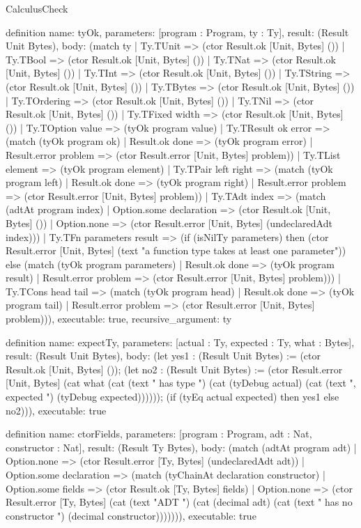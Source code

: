 \begin{lexlean}{CalculusCheck}
\begin{semanticmodule}
definition{
  name: tyOk,
  parameters: [program : Program, ty : Ty],
  result: (Result Unit Bytes),
  body: (match ty
    | Ty.TUnit => (ctor Result.ok [Unit, Bytes] ())
    | Ty.TBool => (ctor Result.ok [Unit, Bytes] ())
    | Ty.TNat => (ctor Result.ok [Unit, Bytes] ())
    | Ty.TInt => (ctor Result.ok [Unit, Bytes] ())
    | Ty.TString => (ctor Result.ok [Unit, Bytes] ())
    | Ty.TBytes => (ctor Result.ok [Unit, Bytes] ())
    | Ty.TOrdering => (ctor Result.ok [Unit, Bytes] ())
    | Ty.TNil => (ctor Result.ok [Unit, Bytes] ())
    | Ty.TFixed width => (ctor Result.ok [Unit, Bytes] ())
    | Ty.TOption value => (tyOk program value)
    | Ty.TResult ok error => (match (tyOk program ok)
      | Result.ok done => (tyOk program error)
      | Result.error problem => (ctor Result.error [Unit, Bytes] problem))
    | Ty.TList element => (tyOk program element)
    | Ty.TPair left right => (match (tyOk program left)
      | Result.ok done => (tyOk program right)
      | Result.error problem => (ctor Result.error [Unit, Bytes] problem))
    | Ty.TAdt index => (match (adtAt program index)
      | Option.some declaration => (ctor Result.ok [Unit, Bytes] ())
      | Option.none => (ctor Result.error [Unit, Bytes] (undeclaredAdt index)))
    | Ty.TFn parameters result => (if (isNilTy parameters) then (ctor Result.error [Unit, Bytes] (text "a function type takes at least one parameter")) else (match (tyOk program parameters)
      | Result.ok done => (tyOk program result)
      | Result.error problem => (ctor Result.error [Unit, Bytes] problem)))
    | Ty.TCons head tail => (match (tyOk program head)
      | Result.ok done => (tyOk program tail)
      | Result.error problem => (ctor Result.error [Unit, Bytes] problem))),
  executable: true,
  recursive_argument: ty
}

definition{
  name: expectTy,
  parameters: [actual : Ty, expected : Ty, what : Bytes],
  result: (Result Unit Bytes),
  body: (let yes1 : (Result Unit Bytes) := (ctor Result.ok [Unit, Bytes] ()); (let no2 : (Result Unit Bytes) := (ctor Result.error [Unit, Bytes] (cat what (cat (text " has type ") (cat (tyDebug actual) (cat (text ", expected ") (tyDebug expected)))))); (if (tyEq actual expected) then yes1 else no2))),
  executable: true
}

definition{
  name: ctorFields,
  parameters: [program : Program, adt : Nat, constructor : Nat],
  result: (Result Ty Bytes),
  body: (match (adtAt program adt)
    | Option.none => (ctor Result.error [Ty, Bytes] (undeclaredAdt adt))
    | Option.some declaration => (match (tyChainAt declaration constructor)
      | Option.some fields => (ctor Result.ok [Ty, Bytes] fields)
      | Option.none => (ctor Result.error [Ty, Bytes] (cat (text "ADT ") (cat (decimal adt) (cat (text " has no constructor ") (decimal constructor))))))),
  executable: true
}


\end{semanticmodule}
\end{lexlean}
